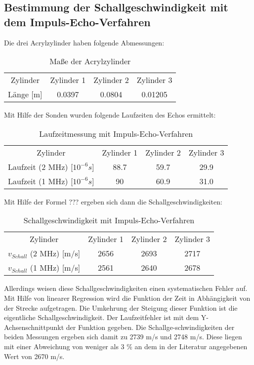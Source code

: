 \documentclass[11pt,ngerman,a4paper]{article}
\begin{document}
\subsection{Bestimmung der Schallgeschwindigkeit mit dem Impuls-Echo-Verfahren}
Die drei Acrylzylinder haben folgende Abmessungen:
 \begin{table}[h]
\centering
 \begin{tabular}{|c||c|c|c|}
 Zylinder & Zylinder 1 & Zylinder 2 & Zylinder 3 \\
  Länge [m] & 0.0397 & 0.0804 & 0.01205 \\
 \end{tabular}
\caption{Maße der Acrylzylinder}
\end{table}
\newline Mit Hilfe der Sonden wurden folgende Laufzeiten des Echos ermittelt:
 \begin{table}[h]
\centering
 \begin{tabular}{|c||c|c|c|}
 Zylinder & Zylinder 1 & Zylinder 2 & Zylinder 3 \\
 Laufzeit (2 MHz) [$10^{-6}s$] & 88.7 & 59.7 & 29.9 \\
 Laufzeit (1 MHz) [$10^{-6}s$] & 90  & 60.9 & 31.0 \\
 \end{tabular}
\caption{Laufzeitmessung mit Impuls-Echo-Verfahren}
\end{table}
\newline
Mit Hilfe der Formel ??? ergeben sich dann die Schallgeschwindigkeiten:
\begin{table}[h]
\centering
 \begin{tabular}{|c||c|c|c|}
 Zylinder & Zylinder 1 & Zylinder 2 & Zylinder 3 \\
 $v_{Schall}$ (2 MHz) [m/s] & 2656 & 2693 & 2717 \\
 $v_{Schall}$ (1 MHz) [m/s] & 2561  & 2640 & 2678 \\
 \end{tabular}
\caption{Schallgeschwindigkeit mit Impuls-Echo-Verfahren}
\end{table}
\newline
Allerdings weisen diese Schallgeschwindigkeiten einen systematischen Fehler auf. Mit Hilfe von linearer Regression wird die Funktion der Zeit in Abhängigkeit von der Strecke aufgetragen. Die Umkehrung der Steigung dieser Funktion ist die eigentliche Schallgeschwindigkeit. Der Laufzeitfehler ist mit dem Y-Achsenschnittpunkt der Funktion gegeben. Die Schallge-schwindigkeiten der beiden Messungen ergeben sich damit zu 2739 m/s und 2748 m/s.
Diese liegen mit einer Abweichung von weniger als 3 \%  an dem in der Literatur angegebenen Wert von 2670 m/s.
\end{document}
